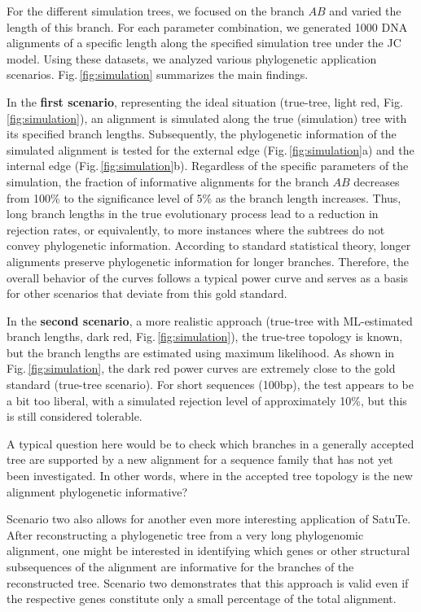 For the different simulation trees, we focused on the branch $AB$ and varied the length of this branch. For each parameter combination, we generated 1000 DNA alignments of a specific length along the specified simulation tree under the JC model. Using these datasets, we analyzed various phylogenetic application scenarios. Fig.\,\ref{fig:simulation} summarizes the main findings.

\medskip

In the \textbf{first scenario}, representing the ideal situation (true-tree, {\color{truetree} light red}, Fig.\,\ref{fig:simulation}), an alignment is simulated along the true (simulation) tree with its specified branch lengths. Subsequently, the phylogenetic information of the simulated alignment is tested for the external edge (Fig.\,\ref{fig:simulation}a) and the internal edge (Fig.\,\ref{fig:simulation}b). Regardless of the specific parameters of the simulation, the fraction of informative alignments for the branch $AB$ decreases from 100\% to the significance level of 5\% as the branch length increases. Thus, long branch lengths in the true evolutionary process lead to a reduction in rejection rates, or equivalently, to more instances where the subtrees do not convey phylogenetic information. According to standard statistical theory, longer alignments preserve phylogenetic information for longer branches. Therefore, the overall behavior of the curves follows a typical power curve and serves as a basis for other scenarios that deviate from this gold standard.

\medskip 

In the \textbf{second scenario}, a more realistic approach (true-tree with ML-estimated branch lengths, {\color{truetreeML} dark red}, Fig.\,\ref{fig:simulation}), the true-tree topology is known, but the branch lengths are estimated using maximum likelihood.  As shown in Fig.\,\ref{fig:simulation}, the dark red power curves are extremely close to the gold standard (true-tree scenario). For short sequences (100bp), the test appears to be a bit too liberal, with a simulated rejection level of approximately 10\%, but this is still considered tolerable.

A typical question here would be to check which branches in a generally accepted tree are supported by a new alignment for a sequence family that has not yet been investigated. In other words, where in the accepted tree topology is the new alignment phylogenetic informative?

Scenario two also allows for another even more interesting application of SatuTe. After reconstructing a phylogenetic tree from a very long phylogenomic alignment, one might be interested in identifying which genes or other structural subsequences of the alignment are informative for the branches of the reconstructed tree. Scenario two demonstrates that this approach is valid even if the respective genes constitute only a small percentage of the total alignment.

